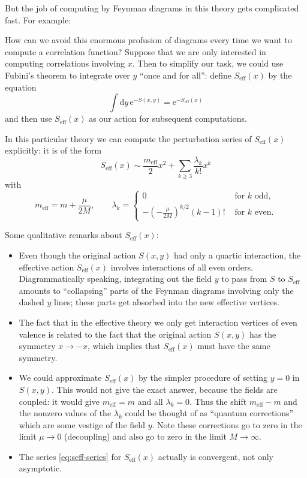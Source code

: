 \documentclass[12pt,letterpaper,reqno]{article}
\numberwithin{equation}{section}
\newcommand{\e}{{\mathrm e}}
\newcommand{\de}{\mathrm{d}}
\newcommand{\eff}{\mathrm{eff}}
\newcommand{\insfig}[2]{

\medskip
\noindent
\begin{minipage}{\linewidth}
\makebox[\linewidth]{\texttt{[image: figures/\#1-crop.pdf]}}
\end{minipage}
\noindent}
\begin{document}
But the job of computing by Feynman diagrams 
in this theory gets complicated fast.
For example:
\insfig{qft-geometry-11}{0.8}
How can we avoid this enormous profusion of diagrams every time we want to 
compute a correlation function?
Suppose that we are only interested in computing correlations involving $x$.
Then to simplify our task, we could use Fubini's theorem to integrate
over $y$ ``once and for all'': define $S_\eff(x)$ by the equation
\begin{equation}
  \int \de y \, \e^{-S(x,y)} = \e^{-S_\eff(x)}
\end{equation}
and then use $S_\eff(x)$ as our action for subsequent computations.

In this particular theory
we can compute the perturbation series of $S_\eff(x)$ explicitly: it is of the form
\begin{equation} \label{eq:seff-series}
  S_\eff(x) \sim \frac{m_\eff}{2} x^2 + \sum_{k \ge 3} \frac{\lambda_k}{k!} x^k
\end{equation}
with
\begin{equation} \label{eq:seff-terms}
  m_\eff = m + \frac{\mu}{2M}, \qquad \lambda_k = \begin{cases} 0 & \text{ for $k$ odd,} \\ - \left( - \frac{\mu}{2M} \right)^{k/2} (k-1)! & \text{ for $k$ even.} \end{cases} 
\end{equation}

Some qualitative remarks about $S_\eff(x)$:
\begin{itemize}
\item Even though the original action $S(x,y)$ had only a quartic interaction, the
effective action $S_\eff(x)$ involves interactions of all even orders.
Diagrammatically speaking, integrating out the field $y$ to pass from $S$ 
to $S_\eff$ amounts to ``collapsing'' parts of the Feynman diagrams
involving only the dashed $y$ lines; these parts get absorbed 
into the new effective vertices.

\item The fact that in the effective theory 
we only get interaction vertices of even valence is
related to the fact that the original action $S(x,y)$ has the symmetry
$x \to -x$, which implies that $S_\eff(x)$ must have the same symmetry.

\item We could approximate $S_\eff(x)$ by the simpler procedure of setting $y=0$ in $S(x,y)$.
This would not give the exact answer, because the fields are coupled: it would
give $m_\eff = m$ and all $\lambda_k = 0$. Thus the shift $m_\eff - m$ and the nonzero 
values of the $\lambda_k$ could be thought of as ``quantum corrections'' which are some vestige
of the field $y$. Note these corrections 
go to zero in the limit $\mu \to 0$ (decoupling) and also go to
zero in the limit $M \to \infty$.
\item The series \eqref{eq:seff-series} for $S_\eff(x)$ actually is convergent, not
only asymptotic.
\end{itemize}
\end{document}
